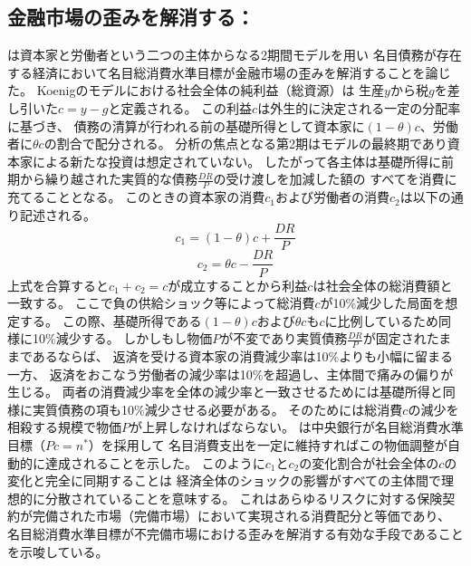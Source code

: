\subsection{金融市場の歪みを解消する：\textcite{Koenig2013}}
\label{sec:chapter2_review_koenig_2013}
\textcite{Koenig2013}は資本家と労働者という二つの主体からなる2期間モデルを用い
名目債務が存在する経済において名目総消費水準目標が金融市場の歪みを解消することを論じた。
Koenigのモデルにおける社会全体の純利益（総資源）は
生産\(y\)から税\(g\)を差し引いた\(c=y-g\)と定義される。
この利益\(c\)は外生的に決定される一定の分配率に基づき、
債務の清算が行われる前の基礎所得として資本家に\((1-\theta)c\)、労働者に\(\theta c\)の割合で配分される。
分析の焦点となる第2期はモデルの最終期であり資本家による新たな投資は想定されていない。
したがって各主体は基礎所得に前期から繰り越された実質的な債務\(\frac{DR}{P}\)の受け渡しを加減した額の
すべてを消費に充てることとなる。
このときの資本家の消費\(c_1\)および労働者の消費\(c_2\)は以下の通り記述される。
\begin{equation}
c_1=(1-\theta)c+\frac{DR}{P}
\end{equation}
\begin{equation}
c_2=\theta c-\frac{DR}{P}
\end{equation}
上式を合算すると\(c_1+c_2=c\)が成立することから利益\(c\)は社会全体の総消費額と一致する。
ここで負の供給ショック等によって総消費\(c\)が10\%減少した局面を想定する。
この際、基礎所得である\((1-\theta)c\)および\(\theta c\)も\(c\)に比例しているため同様に10\%減少する。
しかしもし物価\(P\)が不変であり実質債務\(\frac{DR}{P}\)が固定されたままであるならば、
返済を受ける資本家の消費減少率は10\%よりも小幅に留まる一方、
返済をおこなう労働者の減少率は10\%を超過し、主体間で痛みの偏りが生じる。
両者の消費減少率を全体の減少率と一致させるためには基礎所得と同様に実質債務の項も10\%減少させる必要がある。
そのためには総消費\(c\)の減少を相殺する規模で物価\(P\)が上昇しなければならない。
\textcite{Koenig2013}は中央銀行が名目総消費水準目標（\(Pc=n^*\)）を採用して
名目消費支出を一定に維持すればこの物価調整が自動的に達成されることを示した。
このように\(c_1\)と\(c_2\)の変化割合が社会全体の\(c\)の変化と完全に同期することは
経済全体のショックの影響がすべての主体間で理想的に分散されていることを意味する。
これはあらゆるリスクに対する保険契約が完備された市場（完備市場）において実現される消費配分と等価であり、
名目総消費水準目標が不完備市場における歪みを解消する有効な手段であることを示唆している。

